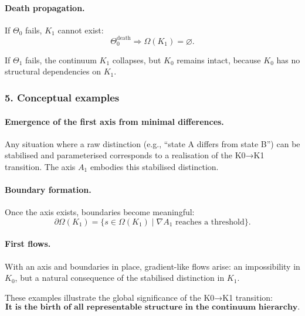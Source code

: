 \paragraph{Death propagation.}
If $\Theta_0$ fails, $K_1$ cannot exist:
\[
\Theta_0^{\mathrm{death}} 
\Rightarrow \Omega(K_1)=\varnothing.
\]

If $\Theta_1$ fails, the continuum $K_1$ collapses, but $K_0$ remains intact,
because $K_0$ has no structural dependencies on $K_1$.

\subsubsection{5. Conceptual examples}

\paragraph{Emergence of the first axis from minimal differences.}
Any situation where a raw distinction (e.g., ``state A differs from state B'')
can be stabilised and parameterised corresponds to a realisation of the
K0→K1 transition. The axis $A_1$ embodies this stabilised distinction.

\paragraph{Boundary formation.}
Once the axis exists, boundaries become meaningful:
\[
\partial\Omega(K_1) = \{ s \in \Omega(K_1) \mid \nabla A_1 \text{ reaches a threshold} \}.
\]

\paragraph{First flows.}
With an axis and boundaries in place, gradient-like flows arise:
an impossibility in $K_0$, but a natural consequence of the stabilised
distinction in $K_1$.

These examples illustrate the global significance of the K0→K1 transition:
\[
\textbf{It is the birth of all representable structure in the continuum hierarchy.}
\]
